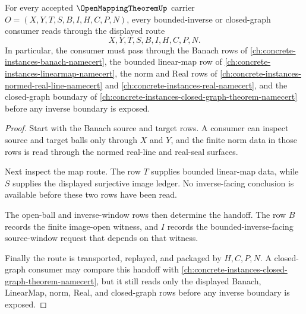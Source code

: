 \begin{theorem}
\label{thm:open-mapping-theorem-closed-graph-consumer-route}
For every accepted $\OpenMappingTheoremUp$ carrier $O=(X,Y,T,S,B,I,H,C,P,N)$, every bounded-inverse or closed-graph consumer reads through the displayed route
$$
X,Y,T,S,B,I,H,C,P,N .
$$
In particular, the consumer must pass through the Banach rows of \autoref{ch:concrete-instances-banach-namecert}, the bounded linear-map row of \autoref{ch:concrete-instances-linearmap-namecert}, the norm and Real rows of \autoref{ch:concrete-instances-normed-real-line-namecert} and \autoref{ch:concrete-instances-real-namecert}, and the closed-graph boundary of \autoref{ch:concrete-instances-closed-graph-theorem-namecert} before any inverse boundary is exposed.
\end{theorem}
\begin{proof}
Start with the Banach source and target rows. A consumer can inspect source and target balls only through $X$ and $Y$, and the finite norm data in those rows is read through the normed real-line and real-seal surfaces.

Next inspect the map route. The row $T$ supplies bounded linear-map data, while $S$ supplies the displayed surjective image ledger. No inverse-facing conclusion is available before these two rows have been read.

The open-ball and inverse-window rows then determine the handoff. The row $B$ records the finite image-open witness, and $I$ records the bounded-inverse-facing source-window request that depends on that witness.

Finally the route is transported, replayed, and packaged by $H,C,P,N$. A closed-graph consumer may compare this handoff with \autoref{ch:concrete-instances-closed-graph-theorem-namecert}, but it still reads only the displayed Banach, LinearMap, norm, Real, and closed-graph rows before any inverse boundary is exposed.
\end{proof}

